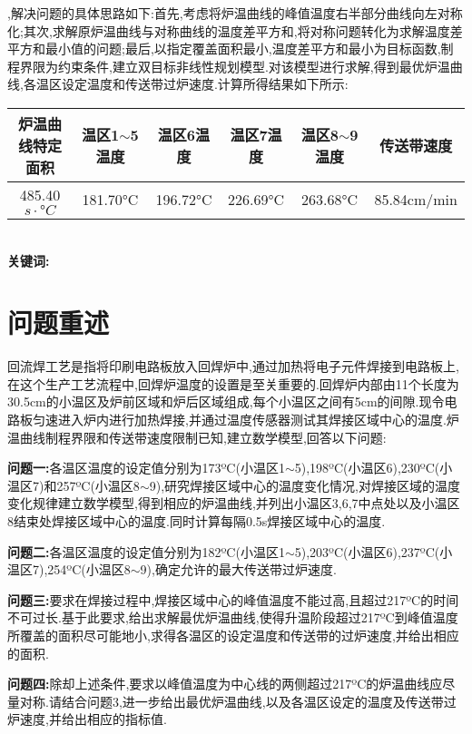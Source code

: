 \documentclass[12pt]{ctexart}
\numberwithin{figure}{section}
\numberwithin{table}{section}
\begin{document}
,解决问题的具体思路如下:首先,考虑将炉温曲线的峰值温度右半部分曲线向左对称化;其次,求解原炉温曲线与对称曲线的温度差平方和,将对称问题转化为求解温度差平方和最小值的问题;最后,以指定覆盖面积最小,温度差平方和最小为目标函数,制程界限为约束条件,建立双目标非线性规划模型.对该模型进行求解,得到最优炉温曲线,各温区设定温度和传送带过炉速度.计算所得结果如下所示:
\begin{longtable}
\centering
\caption*{}
\small{\begin{tabular}{c|c|c|c|c|c}
\hline
炉温曲线特定面积&温区1$\sim$5温度&温区6温度&温区7温度&温区8$\sim$9温度&传送带速度\\
\hline
485.40$s\cdot°C$&181.70°C&196.72°C&226.69°C&263.68°C&85.84cm/min\\
\hline
    \end{tabular}}
    \end{longtable}\\
\textbf{关键词:}    



\newpage
\pagestyle{plain}
\setcounter{page}{1}
\section{问题重述}
回流焊工艺是指将印刷电路板放入回焊炉中,通过加热将电子元件焊接到电路板上,在这个生产工艺流程中,回焊炉温度的设置是至关重要的.回焊炉内部由11个长度为30.5cm的小温区及炉前区域和炉后区域组成,每个小温区之间有5cm的间隙.现令电路板匀速进入炉内进行加热焊接,并通过温度传感器测试其焊接区域中心的温度.炉温曲线制程界限和传送带速度限制已知,建立数学模型,回答以下问题:

\textbf{问题一:}各温区温度的设定值分别为173ºC(小温区1$\sim$5),198ºC(小温区6),230ºC(小温区7)和257ºC(小温区8$\sim$9),研究焊接区域中心的温度变化情况,对焊接区域的温度变化规律建立数学模型,得到相应的炉温曲线,并列出小温区3,6,7中点处以及小温区8结束处焊接区域中心的温度.同时计算每隔0.5s焊接区域中心的温度.

\textbf{问题二:}各温区温度的设定值分别为182ºC(小温区1$\sim$5),203ºC(小温区6),237ºC(小温区7),254ºC(小温区8$\sim$9),确定允许的最大传送带过炉速度.

\textbf{问题三:}要求在焊接过程中,焊接区域中心的峰值温度不能过高,且超过217ºC的时间不可过长.基于此要求,给出求解最优炉温曲线,使得升温阶段超过217ºC到峰值温度所覆盖的面积尽可能地小,求得各温区的设定温度和传送带的过炉速度,并给出相应的面积.

\textbf{问题四:}除却上述条件,要求以峰值温度为中心线的两侧超过217ºC的炉温曲线应尽量对称.请结合问题3,进一步给出最优炉温曲线,以及各温区设定的温度及传送带过炉速度,并给出相应的指标值.
\end{document}
